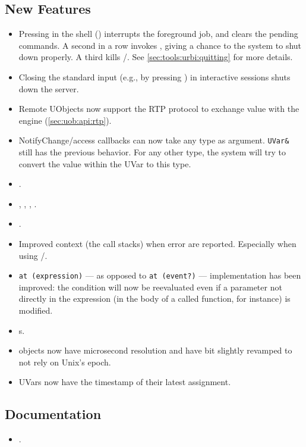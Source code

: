 \subsection{New Features}
\begin{itemize}
\item Pressing  in the \us shell () interrupts
  the foreground job, and clears the pending commands.  A second
   in a row invokes , giving a
  chance to the system to shut down properly.  A third  kills
  /.  See
  \autoref{sec:tools:urbi:quitting} for more details.
\item Closing the standard input (e.g., by pressing ) in
  interactive sessions shuts down the server.
\item Remote UObjects now support the RTP protocol to exchange value with
  the engine (\autoref{sec:uob:api:rtp}).
\item NotifyChange/access callbacks can now take any type as argument.
  \lstinline|UVar&| still has the previous behavior. For any other type,
  the system will try to convert the value within the UVar to this type.
\item {}.
\item {}, , ,
  .
\item {}.
\item Improved context (the call stacks) when error are reported.
  Especially when using /.
\item \lstinline|at (expression)| --- as opposed to \lstinline|at (event?)| ---
  implementation has been improved: the condition will now be reevaluated even
  if a parameter not directly in the expression (in the body of a called
  function, for instance) is modified.
\item {}s.
\item {} objects now have microsecond resolution and
  have bit slightly revamped to not rely on Unix's epoch.
\item UVars now have the timestamp of their latest assignment.
\end{itemize}

\subsection{Documentation}
\begin{itemize}
\item {}.
\end{itemize}

